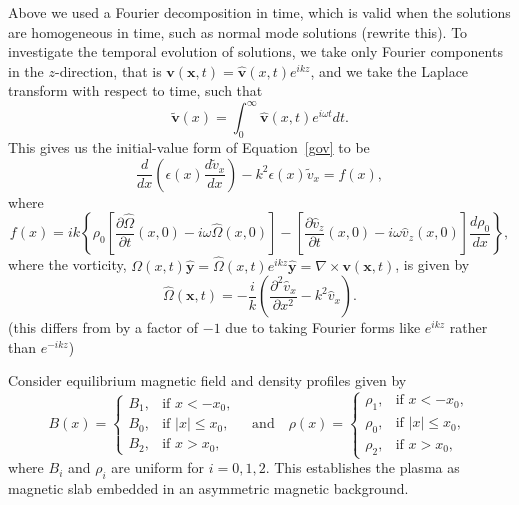 \documentclass{aastex61}
\begin{document}
Above we used a Fourier decomposition in time, which is valid when the solutions are homogeneous in time, such as normal mode solutions (rewrite this). To investigate the temporal evolution of solutions, we take only Fourier components in the $z$-direction, that is $\mathbf{v}(\mathbf{x},t) = \mathbf{\hat{v}}(x,t)e^{ikz}$, and we take the Laplace transform with respect to time, such that
\begin{equation}
\mathbf{\tilde{v}}(x) = \int_0^\infty \mathbf{\widehat{v}}(x,t)e^{i\omega t} dt.
\end{equation}
This gives us the initial-value form of Equation~\eqref{gov} to be
\begin{equation}
\frac{d}{dx}\left(\epsilon(x) \frac{d\tilde{v}_x}{dx}\right) - k^2\epsilon(x)\tilde{v}_x = f(x),
\label{ivp gov}
\end{equation}
where
\begin{equation}
f(x) = ik\left\{\rho_0\left[\frac{\partial\hat{\Omega}}{\partial t}(x,0) - i\omega\hat{\Omega}(x,0)\right] - \left[\frac{\partial\hat{v}_z}{\partial t}(x,0) - i\omega \hat{v}_z(x,0)\right]\frac{d\rho_0}{dx}\right\},
\label{f}
\end{equation}
where the vorticity, $\Omega(x,t)\mathbf{\hat{y}} = \hat{\Omega}(x,t)e^{ikz}\mathbf{\hat{y}} = \nabla \times \mathbf{v}(\mathbf{x},t)$, is given by
\begin{equation}
\hat{\Omega}(\mathbf{x},t) = -\frac{i}{k}\left(\frac{\partial^2\hat{v}_x}{\partial x^2} - k^2 \hat{v}_x\right).
\end{equation}
(this differs from \cite{rae_etal81} by a factor of $-1$ due to taking Fourier forms like $e^{ikz}$ rather than $e^{-ikz}$)

Consider equilibrium magnetic field and density profiles given by
\begin{equation}
B(x)=
\begin{cases}
B_1, & \text{if  }x<-x_0, \\
B_0, & \text{if }|x|\leq{x_0}, \\
B_2, & \text{if  }x>x_0,
\end{cases}
\quad \text{and} \quad
\rho(x)=
\begin{cases}
\rho_1, & \text{if  }x<-x_0, \\
\rho_0, & \text{if }|x|\leq{x_0}, \\
\rho_2, & \text{if  }x>x_0,
\end{cases}
\end{equation}
where $B_i$ and $\rho_i$ are uniform for $i = 0,1,2$. This establishes the plasma as magnetic slab embedded in an asymmetric magnetic background.
\end{document}
